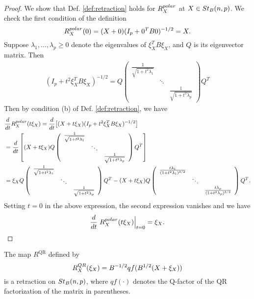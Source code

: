 \documentclass[11pt,a4paper]{article}
\begin{document}
\begin{proof}
We show that Def. \ref{def:retraction} holds for $R^{polar}_X$ at $X\in St_B(n,p)$. We check the first condition of the definition
\begin{equation*}
R^{polar}_X(0) = (X+0)(I_p+0^T B 0)^{-1/2} = X.
\end{equation*}
Suppose $\lambda_1,\ldots,\lambda_p\ge 0$ denote the eigenvalues of $\xi_X^TB\xi_X$, and $Q$ is its eigenvector matrix. Then
\begin{align*}
(I_p+t^2\xi_X^TB\xi_X)^{-1/2} = 
Q\left(
\begin{array}{ccc}
\frac{1}{\sqrt{1+t^2\lambda_1}} &  & \\
 & \ddots & \\
 & & \frac{1}{\sqrt{1+t^2\lambda_p}}
\end{array}
\right)Q^T
\end{align*}
Then by condition (b) of Def. \ref{def:retraction}, we have
\begin{align*}
&\dfrac{d}{dt}R^{polar}_X(t\xi_X) = 
\dfrac{d}{dt}\big[(X+t\xi_X)(I_p+t^2\xi_X^TB\xi_X)^{-1/2} \big]\\
&= \dfrac{d}{dt}\left[
(X+t\xi_X)Q\left(
\begin{array}{ccc}
\frac{1}{\sqrt{1+t^2\lambda_1}} &  & \\
 & \ddots & \\
 & & \frac{1}{\sqrt{1+t^2\lambda_p}}
\end{array}
\right)Q^T\right] \\
&= \xi_XQ\left(
\begin{array}{ccc}
\frac{1}{\sqrt{1+t^2\lambda_1}} &  & \\
 & \ddots & \\ 
 & & \frac{1}{\sqrt{1+t^2\lambda_p}}
\end{array}
\right)Q^T - 
(X+t\xi_X)Q\left(
\begin{array}{ccc}
\frac{t\lambda_1}{(1+t^2\lambda_1)^{3/2}} &  & \\
 & \ddots & \\
 & & \frac{t\lambda_p}{(1+t^2\lambda_p)^{3/2}}
\end{array}
\right)Q^T.
\end{align*}
Setting $t = 0$ in the above expression, the second expression vanishes and we have
\begin{equation*}
\dfrac{d}{dt}\left.R^{polar}_X(t\xi_X)\right|_{t=0} = \xi_X.
\end{equation*}
\end{proof}

\begin{proposition}
The map $R^{\text{QR}}$ defined by 
\begin{equation}
R^{QR}_X(\xi_X) = B^{-1/2}qf(B^{1/2}(X+\xi_X))
\end{equation}
is a retraction on $St_B(n,p)$, where $qf(\cdot)$ denotes the Q-factor of the QR factorization of the matrix in parentheses.
\end{proposition}
\end{document}
